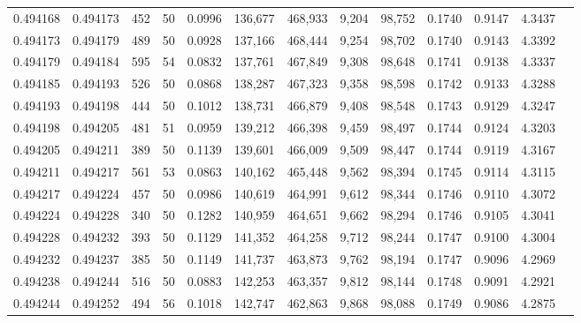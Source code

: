\begin{tabular}{rrrrrrrrrrrrr}
0.494168 & 0.494173 &   452 &  50 &                                     0.0996 & 136,677 & 468,933 &   9,204 &  98,752 & 0.1740 & 0.9147 & 4.3437 \\
0.494173 & 0.494179 &   489 &  50 &                                     0.0928 & 137,166 & 468,444 &   9,254 &  98,702 & 0.1740 & 0.9143 & 4.3392 \\
0.494179 & 0.494184 &   595 &  54 &                                     0.0832 & 137,761 & 467,849 &   9,308 &  98,648 & 0.1741 & 0.9138 & 4.3337 \\
0.494185 & 0.494193 &   526 &  50 &                                     0.0868 & 138,287 & 467,323 &   9,358 &  98,598 & 0.1742 & 0.9133 & 4.3288 \\
0.494193 & 0.494198 &   444 &  50 &                                     0.1012 & 138,731 & 466,879 &   9,408 &  98,548 & 0.1743 & 0.9129 & 4.3247 \\
0.494198 & 0.494205 &   481 &  51 &                                     0.0959 & 139,212 & 466,398 &   9,459 &  98,497 & 0.1744 & 0.9124 & 4.3203 \\
0.494205 & 0.494211 &   389 &  50 &                                     0.1139 & 139,601 & 466,009 &   9,509 &  98,447 & 0.1744 & 0.9119 & 4.3167 \\
0.494211 & 0.494217 &   561 &  53 &                                     0.0863 & 140,162 & 465,448 &   9,562 &  98,394 & 0.1745 & 0.9114 & 4.3115 \\
0.494217 & 0.494224 &   457 &  50 &                                     0.0986 & 140,619 & 464,991 &   9,612 &  98,344 & 0.1746 & 0.9110 & 4.3072 \\
0.494224 & 0.494228 &   340 &  50 &                                     0.1282 & 140,959 & 464,651 &   9,662 &  98,294 & 0.1746 & 0.9105 & 4.3041 \\
0.494228 & 0.494232 &   393 &  50 &                                     0.1129 & 141,352 & 464,258 &   9,712 &  98,244 & 0.1747 & 0.9100 & 4.3004 \\
0.494232 & 0.494237 &   385 &  50 &                                     0.1149 & 141,737 & 463,873 &   9,762 &  98,194 & 0.1747 & 0.9096 & 4.2969 \\
0.494238 & 0.494244 &   516 &  50 &                                     0.0883 & 142,253 & 463,357 &   9,812 &  98,144 & 0.1748 & 0.9091 & 4.2921 \\
0.494244 & 0.494252 &   494 &  56 &                                     0.1018 & 142,747 & 462,863 &   9,868 &  98,088 & 0.1749 & 0.9086 & 4.2875 \\

\end{tabular}
